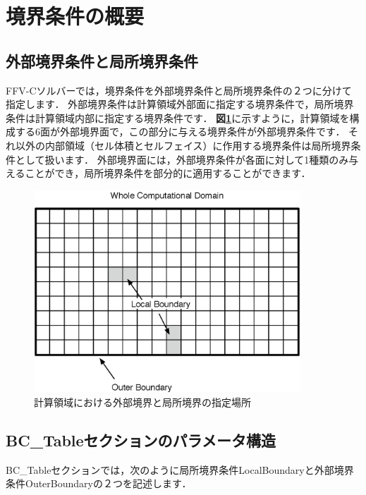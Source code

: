 \graphicspath{{./fig_BC/}}

%
\section{境界条件の概要}

%
\hypertarget{tgt:BC policy}{\subsection{外部境界条件と局所境界条件}}
FFV-Cソルバーでは，境界条件を外部境界条件と局所境界条件の２つに分けて指定します．
外部境界条件は計算領域外部面に指定する境界条件で，局所境界条件は計算領域内部に指定する境界条件です．
\textbf{図\ref{fig:BCs}}に示すように，計算領域を構成する6面が外部境界面で，この部分に与える境界条件が外部境界条件です．
それ以外の内部領域（セル体積とセルフェイス）に作用する境界条件は局所境界条件として扱います．
外部境界面には，外部境界条件が各面に対して1種類のみ与えることができ，局所境界条件を部分的に適用することができます．

\begin{figure}[htbp]
\begin{center}
\includegraphics[width=10cm,clip]{Boundary.eps}
\end{center}
\caption{計算領域における外部境界と局所境界の指定場所}
\label{fig:BCs}
\end{figure}


%
\subsection{BC\_Tableセクションのパラメータ構造}

BC\_Tableセクションでは，次のように局所境界条件LocalBoundaryと外部境界条件OuterBoundaryの２つを記述します．

